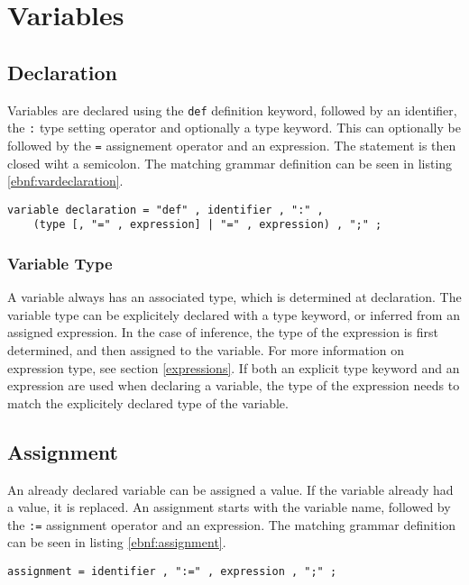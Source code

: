 \documentclass[a4paper,appendixprefix]{scrreprt}
\begin{document}
\chapter{Variables}

\section{Declaration}
Variables are declared using the \verb!def! definition keyword, followed by an identifier, the \verb!:! type setting operator and optionally a type keyword. This can optionally be followed by the \verb!=! assignement operator and an expression. The statement is then closed wiht a semicolon. The matching grammar definition can be seen in listing \ref{ebnf:vardeclaration}.

\begin{lstlisting}[label={ebnf:vardeclaration},caption={Variable Declaration Grammar}]
variable declaration = "def" , identifier , ":" , 
	(type [, "=" , expression] | "=" , expression) , ";" ;
\end{lstlisting}

\subsection{Variable Type}
A variable always has an associated type, which is determined at declaration. The variable type can be explicitely declared with a type keyword, or inferred from an assigned expression. In the case of inference, the type of the expression is first determined, and then assigned to the variable. For more information on expression type, see section \ref{expressions}. If both an explicit type keyword and an expression are used when declaring a variable, the type of the expression needs to match the explicitely declared type of the variable.

\section{Assignment}
An already declared variable can be assigned a value. If the variable already had a value, it is replaced. An assignment starts with the variable name, followed by the \verb!:=! assignment operator and an expression. The matching grammar definition can be seen in listing \ref{ebnf:assignment}.

\begin{lstlisting}[label={ebnf:assignment},caption={Variable Assignment Grammar}]
assignment = identifier , ":=" , expression , ";" ;
\end{lstlisting}
\end{document}
